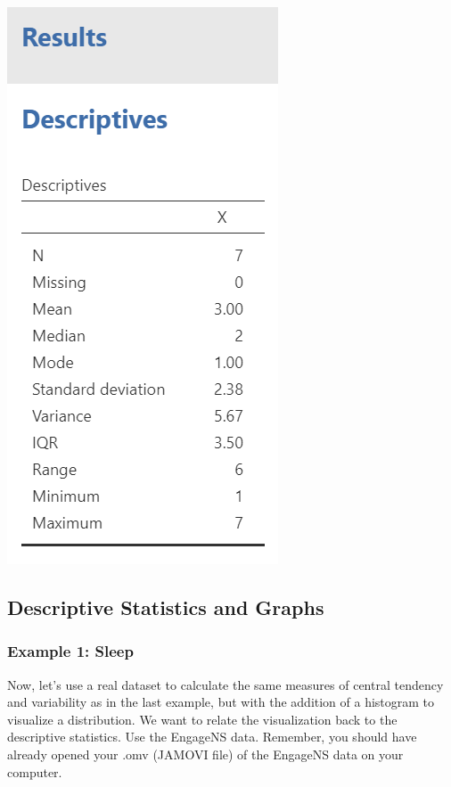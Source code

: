 \documentclass[
]{book}
\begin{document}
\includegraphics{img/2.5.5.png}

\hypertarget{descriptive-statistics-and-graphs}{%
\subsection{Descriptive Statistics and Graphs}\label{descriptive-statistics-and-graphs}}

\hypertarget{example-1-sleep}{%
\subsubsection{Example 1: Sleep}\label{example-1-sleep}}

Now, let's use a real dataset to calculate the same measures of central tendency and variability as in the last example, but with the addition of a histogram to visualize a distribution. We want to relate the visualization back to the descriptive statistics. Use the EngageNS data. Remember, you should have already opened your .omv (JAMOVI file) of the EngageNS data on your computer.
\end{document}

